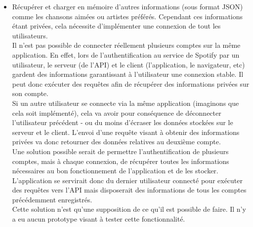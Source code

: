 \documentclass{article}
\begin{document}
		\begin{itemize}
			\item Récupérer et charger en mémoire d'autres informations (sous format JSON) comme les chansons aimées ou artistes préférés. Cependant ces informations étant privées, cela nécessite d'implémenter une connexion de tout les utilisateurs.\\
			Il n'est pas possible de connecter réellement plusieurs comptes sur la même application. En effet, lors de l'authentification au service de Spotify par un utilisateur, le serveur (de l'API) et le client (l'application, le navigateur, etc) gardent des informations garantissant à l'utilisateur une connexion stable. Il peut donc exécuter des requêtes afin de récupérer des informations privées sur son compte.\\
			Si un autre utilisateur se connecte via la même application (imaginons que cela soit implémenté), cela va avoir pour conséquence de déconnecter l'utilisateur précédent - ou du moins d'écraser les données stockées sur le serveur et le client. L'envoi d'une requête visant à obtenir des informations privées va donc retourner des données relatives au deuxième compte.\\
			Une solution possible serait de permettre l'authentification de plusieurs comptes, mais à chaque connexion, de récupérer toutes les informations nécessaires au bon fonctionnement de l'application et de les stocker. L'application se servirait donc du dernier utilisateur connecté pour exécuter des requêtes vers l'API mais disposerait des informations de tous les comptes précédemment enregistrés.\\
			Cette solution n'est qu'une supposition de ce qu'il est possible de faire. Il n'y a eu aucun prototype visant à tester cette fonctionnalité.
		\end{itemize}
\end{document}
